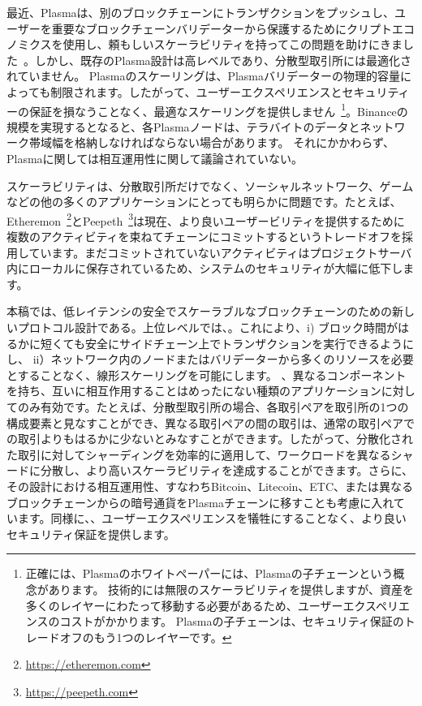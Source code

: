 最近、Plasmaは、別のブロックチェーンにトランザクションをプッシュし、ユーザーを重要なブロックチェーンバリデーターから保護するためにクリプトエコノミクスを使用し、頼もしいスケーラビリティを持ってこの問題を助けにきました~\cite{plasma}。しかし、既存のPlasma設計は高レベルであり、分散型取引所には最適化されていません。 Plasmaのスケーリングは、Plasmaバリデーターの物理的容量によっても制限されます。したがって、ユーザーエクスペリエンスとセキュリティーの保証を損なうことなく、最適なスケーリングを提供しません~\footnote{正確には、Plasmaのホワイトペーパーには、Plasmaの子チェーンという概念があります。 技術的には無限のスケーラビリティを提供しますが、資産を多くのレイヤーにわたって移動する必要があるため、ユーザーエクスペリエンスのコストがかかります。 Plasmaの子チェーンは、セキュリティ保証のトレードオフのもう1つのレイヤーです。}。Binanceの規模を実現するとなると、各Plasmaノードは、テラバイトのデータとネットワーク帯域幅を格納しなければならない場合があります。 それにかかわらず、Plasmaに関しては相互運用性に関して議論されていない。

スケーラビリティは、分散取引所だけでなく、ソーシャルネットワーク、ゲームなどの他の多くのアプリケーションにとっても明らかに問題です。たとえば、Etheremon~\footnote{\url{https://etheremon.com}}とPeepeth~\footnote{\url{https://peepeth.com}}は現在、より良いユーザービリティを提供するために複数のアクティビティを束ねてチェーンにコミットするというトレードオフを採用しています。まだコミットされていないアクティビティはプロジェクトサーバ内にローカルに保存されているため、システムのセキュリティが大幅に低下します。

本稿では、低レイテンシの安全でスケーラブルなブロックチェーンのための新しいプロトコル設計である。上位レベルでは、。これにより、i) ブロック時間がはるかに短くても安全にサイドチェーン上でトランザクションを実行できるようにし、 ii）ネットワーク内のノードまたはバリデーターから多くのリソースを必要とすることなく、線形スケーリングを可能にします。 、異なるコンポーネントを持ち、互いに相互作用することはめったにない種類のアプリケーションに対してのみ有効です。たとえば、分散型取引所の場合、各取引ペアを取引所の1つの構成要素と見なすことができ、異なる取引ペアの間の取引は、通常の取引ペアでの取引よりもはるかに少ないとみなすことができます。したがって、分散化された取引に対してシャーディングを効率的に適用して、ワークロードを異なるシャードに分散し、より高いスケーラビリティを達成することができます。さらに、その設計における相互運用性、すなわちBitcoin、Litecoin、ETC、または異なるブロックチェーンからの暗号通貨をPlasmaチェーンに移すことも考慮に入れています。同様に、、ユーザーエクスペリエンスを犠牲にすることなく、より良いセキュリティ保証を提供します。

